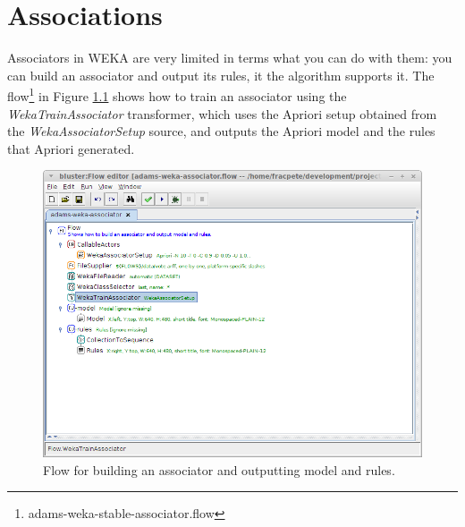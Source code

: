 %

\chapter{Associations}
\label{associations}

Associators in WEKA are very limited in terms what you can do with them: you
can build an associator and output its rules, it the algorithm supports it.
The flow\footnote{adams-weka-stable-associator.flow} in Figure \ref{associator}
shows how to train an associator using the \textit{WekaTrainAssociator}
transformer, which uses the Apriori setup obtained from the \textit{WekaAssociatorSetup}
source, and outputs the Apriori model and the rules that Apriori generated.

\begin{figure}[htb]
  \centering
  \includegraphics[width=12.0cm]{images/associator.png}
  \caption{Flow for building an associator and outputting model and rules.}
  \label{associator}
\end{figure}
